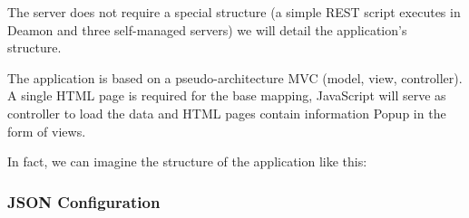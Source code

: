 

The server does not require a special structure (a simple REST script executes in Deamon and three self-managed servers) we will detail the application's structure.

The application is based on a pseudo-architecture MVC (model, view, controller). A single HTML page is required for the base mapping, JavaScript will serve as controller to load the data and HTML pages contain information Popup in the form of views.

In fact, we can imagine the structure of the application like this: \\
\noindent{}



\subsubsection{JSON Configuration}

